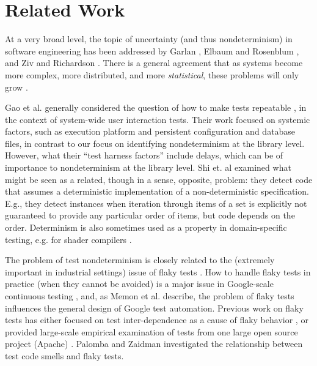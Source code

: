 \section{Related Work}

At a very broad level, the topic of uncertainty (and thus nondeterminism) in software engineering has been addressed by Garlan \cite{GarlanUncertain}, Elbaum and Rosenblum \cite{Unknowns,lu2015roundtable}, and Ziv and Richardson \cite{UncertaintyPrinciple}.  There is a general agreement that as systems become more complex, more distributed, and more \emph{statistical}, these problems will only grow \cite{lu2015roundtable}.

Gao et al. generally considered the question of how to make tests repeatable \cite{Gao:2015:MSU:2818754.2818764}, in the context of system-wide user interaction tests.  Their work focused on systemic factors, such as execution platform and persistent configuration and database files, in contrast to our focus on identifying nondeterminism at the library level.  However, what their ``test harness factors'' include delays, which can be of importance to nondeterminism at the library level.
Shi et. al \cite{DetermImp} examined what might be seen as a related, though in a sense, opposite, problem:  they detect code that assumes a deterministic implementation of a non-deterministic specification.  E.g., they detect instances when  iteration through items of a set is explicitly not guaranteed to provide any particular order of items, but code depends on the order. Determinism is also sometimes used as a property in domain-specific testing, e.g. for shader compilers \cite{shader}.

The problem of test nondeterminism is closely related to the (extremely important in industrial settings) issue of flaky tests \cite{miccoflaky, luo2014empirical,palomba2017does,listfieldtestanalysis}.  How to handle flaky tests in practice (when they cannot be avoided) is a major issue in Google-scale continuous testing \cite{memon2017taming}, and, as Memon et al. describe, the problem of flaky tests influences the general design of Google test automation.
Previous work on flaky tests has either focused on test inter-dependence as a cause of flaky behavior \cite{LamZE2015}, or provided large-scale empirical examination of tests from one large open source project (Apache) \cite{luo2014empirical,palomba2017does}.  Palomba and Zaidman \cite{palomba2017does} investigated the relationship between test code smells and flaky tests.

